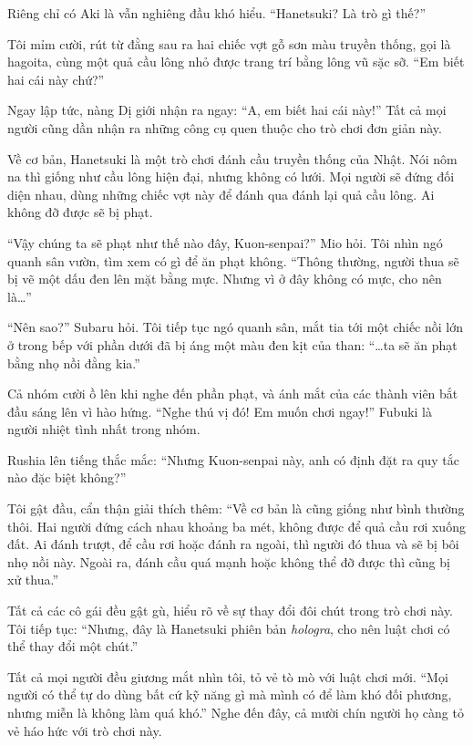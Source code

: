 \documentclass[../main.tex]{subfiles}
\begin{document}
Riêng chỉ có Aki là vẫn nghiêng đầu khó hiểu. ``Hanetsuki? Là trò gì thế?''

Tôi mỉm cười, rút từ đằng sau ra hai chiếc vợt gỗ sơn màu truyền thống, gọi là hagoita, cùng một quả cầu lông nhỏ được trang trí bằng lông vũ sặc sỡ. ``Em biết hai cái này chứ?''

Ngay lập tức, nàng Dị giới nhận ra ngay: ``A, em biết hai cái này!'' Tất cả mọi người cũng dần nhận ra những công cụ quen thuộc cho trò chơi đơn giản này.

Về cơ bản, Hanetsuki là một trò chơi đánh cầu truyền thống của Nhật. Nói nôm na thì giống như cầu lông hiện đại, nhưng không có lưới. Mọi người sẽ đứng đối diện nhau, dùng những chiếc vợt này để đánh qua đánh lại quả cầu lông. Ai không đỡ được sẽ bị phạt.

``Vậy chúng ta sẽ phạt như thế nào đây, Kuon-senpai?'' Mio hỏi. Tôi nhìn ngó quanh sân vườn, tìm xem có gì để ăn phạt không. ``Thông thường, người thua sẽ bị vẽ một dấu đen lên mặt bằng mực. Nhưng vì ở đây không có mực, cho nên là\dots''

``Nên sao?'' Subaru hỏi. Tôi tiếp tục ngó quanh sân, mắt tia tới một chiếc nồi lớn ở trong bếp với phần dưới đã bị áng một màu đen kịt của than: ``\dots ta sẽ ăn phạt bằng nhọ nồi đằng kia.''

Cả nhóm cười ồ lên khi nghe đến phần phạt, và ánh mắt của các thành viên bắt đầu sáng lên vì hào hứng. ``Nghe thú vị đó! Em muốn chơi ngay!'' Fubuki là người nhiệt tình nhất trong nhóm.

Rushia lên tiếng thắc mắc: ``Nhưng Kuon-senpai này, anh có định đặt ra quy tắc nào đặc biệt không?''

Tôi gật đầu, cẩn thận giải thích thêm: ``Về cơ bản là cũng giống như bình thường thôi. Hai người đứng cách nhau khoảng ba mét, không được để quả cầu rơi xuống đất. Ai đánh trượt, để cầu rơi hoặc đánh ra ngoài, thì người đó thua và sẽ bị bôi nhọ nồi này. Ngoài ra, đánh cầu quá mạnh hoặc không thể đỡ được thì cũng bị xử thua.''

Tất cả các cô gái đều gật gù, hiểu rõ về sự thay đổi đôi chút trong trò chơi này. Tôi tiếp tục: ``Nhưng, đây là Hanetsuki phiên bản \textit{hologra}, cho nên luật chơi có thể thay đổi một chút.''

Tất cả mọi người đều giương mắt nhìn tôi, tỏ vẻ tò mò với luật chơi mới. ``Mọi người có thể tự do dùng bất cứ kỹ năng gì mà mình có để làm khó đối phương, nhưng miễn là không làm quá khó.'' Nghe đến đây, cả mười chín người họ càng tỏ vẻ háo hức với trò chơi này.
\end{document}
